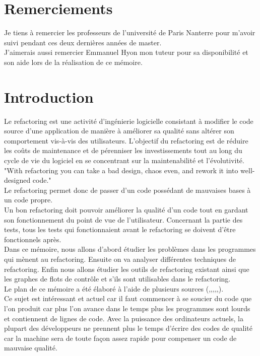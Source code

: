 \documentclass[a4paper,twoside,12pt,openright]{report}
\begin{document}
\section{Remerciements}
Je tiens à remercier les professeurs de l'université de Paris Nanterre pour m'avoir suivi pendant ces deux dernières années de master.\\
J'aimerais aussi remercier Emmanuel Hyon mon tuteur pour sa disponibilité et son aide lors de la réalisation de ce mémoire.\\


\section{Introduction}
Le refactoring est une activité d'ingénierie logicielle consistant à modifier le code source d'une application de manière à améliorer sa qualité sans altérer son comportement vis-à-vis des utilisateurs.
L'objectif du refactoring est de réduire les coûts de maintenance et de pérenniser les investissements tout au long du cycle de vie du logiciel en se concentrant sur la maintenabilité et l'évolutivité.\cite{ref1}\\
"With refactoring you can take a bad design, chaos even, and rework it into well-designed code."\cite{ref2}\\
Le refactoring permet donc de passer d'un code possédant de mauvaises bases à un code propre.\\
Un bon refactoring doit pouvoir améliorer la qualité d'un code tout en gardant son fonctionnement du point de vue de l'utilisateur. Concernant la partie des tests, tous les tests qui fonctionnaient avant le refactoring se doivent d'être fonctionnels après.\\
Dans ce mémoire, nous allons d'abord étudier les problèmes dans les programmes qui mènent au refactoring. Ensuite on va analyser différentes techniques de refactoring. Enfin nous allons étudier les outils de refactoring existant ainsi que les graphes de flots de contrôle et s'ils sont utilisables dans le refactoring.\\
Le plan de ce mémoire a été élaboré à l'aide de plusieurs sources (\cite{ref3},\cite{ref4},\cite{ref5},\cite{ref8},\cite{ref14},\cite{ref7}).\\
Ce sujet est intéressant et actuel car il faut commencer à se soucier du code que l'on produit car plus l'on avance dans le temps plus les programmes sont lourds et contiennent de lignes de code. Avec la puissance des ordinateurs actuels, la plupart des développeurs ne prennent plus le temps d'écrire des codes de qualité car la machine sera de toute façon assez rapide pour compenser un code de mauvaise qualité.\cite{ref4}\\
\end{document}

